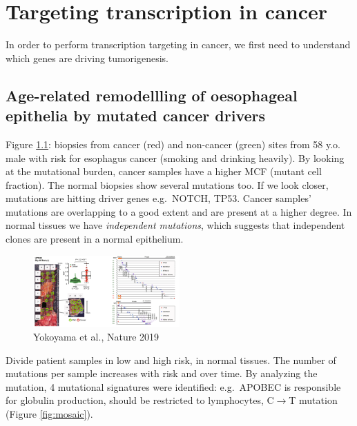 \graphicspath{{chapters/_resources/}}

\chapter{Targeting transcription in cancer}
In order to perform transcription targeting in cancer, we first need to understand which genes are driving tumorigenesis.

\hypertarget{age-related-remodellling-of-oesophageal-epithelia-by-mutated-cancer-drivers}{%
\section{Age-related remodellling of oesophageal epithelia by mutated cancer drivers}\label{age-related-remodellling-of-oesophageal-epithelia-by-mutated-cancer-drivers}}

Figure \ref{fig:biopsies}: biopsies from cancer (red) and non-cancer (green) sites from 58 y.o. male with risk for esophagus cancer (smoking and drinking heavily). By looking at the mutational burden, cancer samples have a higher MCF (mutant cell fraction). The normal biopsies show several mutations too. If we look closer, mutations are hitting driver genes e.g.~NOTCH, TP53. Cancer samples' mutations are overlapping to a good extent and are present at a higher degree. In normal tissues we have \emph{independent mutations}, which suggests that independent clones are present in a normal epithelium.

\begin{figure}
\centering
\includegraphics[width=0.5\textwidth]{../_resources/Screen_Shot_2022-11-04_at_10-50-01.png}
\caption{Yokoyama et al., Nature 2019}
\label{fig:biopsies}
\end{figure}

Divide patient samples in low and high risk, in normal tissues. The number of mutations per sample increases with risk and over time. By analyzing the mutation, 4 mutational signatures were identified: e.g.~APOBEC is responsible for globulin production, should be restricted to lymphocytes, C$\rightarrow$T mutation (Figure \ref{fig:mosaic}).

